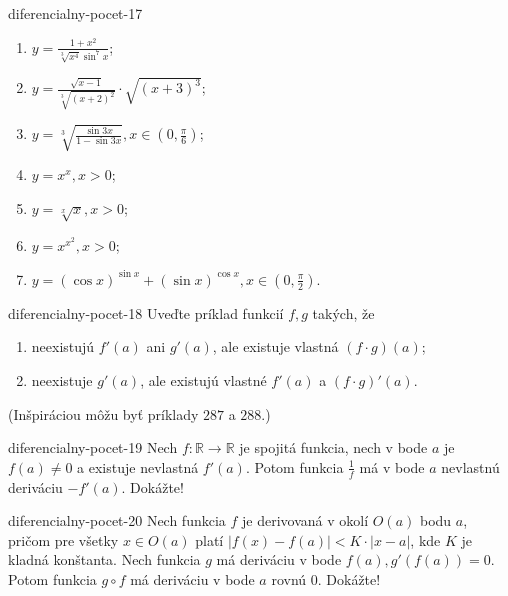 \begin{defproblem}{diferencialny-pocet-17}
\begin{multicols}{2}
\begin{enumerate}
    \item $y=\frac{1+x^2}{\sqrt[3]{x^4}\sin^7 x}$;
    \item $y=\frac{\sqrt{x-1}}{\sqrt[3]{(x+2)^2}}\cdot\sqrt{(x+3)^3}$;
    \item $y=\sqrt[3]{\frac{\sin 3x}{1-\sin 3x}},x\in(0,\frac{\pi}{6})$;
    \item $y=x^x,x>0$;
    \item $y=\sqrt[x]{x},x>0$;
    \item $y=x^{x^2},x>0$;
    \item $y=(\cos x)^{\sin x}+(\sin x)^{\cos x},x\in(0,\frac{\pi}{2})$.
\end{enumerate}
\end{multicols}
\end{defproblem}

\begin{defproblem}{diferencialny-pocet-18}
Uveďte príklad funkcií $f,g$ takých, že 
\begin{enumerate}
\item neexistujú $f'(a)$ ani $g'(a)$, ale existuje vlastná $(f\cdot g)(a)$;
\item neexistuje $g'(a)$, ale existujú vlastné $f'(a)$ a $(f\cdot g)'(a)$.
\end{enumerate}
(Inšpiráciou môžu byť príklady $287$ a $288$.)
\end{defproblem}

\begin{defproblem}{diferencialny-pocet-19}
Nech $f:\mathbb{R}\rightarrow\mathbb{R}$ je spojitá funkcia, nech v bode $a$ je $f(a)\neq 0$ a existuje nevlastná $f'(a)$. Potom funkcia $\frac{1}{f}$ má v bode $a$ nevlastnú deriváciu $-f'(a)$. Dokážte!
\end{defproblem}

\begin{defproblem}{diferencialny-pocet-20}
Nech funkcia $f$ je derivovaná v okolí $O(a)$ bodu $a$, pričom pre všetky $x\in O(a)$ platí $|f(x)-f(a)|<K\cdot |x-a|$, kde $K$ je kladná konštanta. Nech funkcia $g$ má deriváciu v bode $f(a),g'(f(a))=0$. Potom funkcia $g \circ f$ má deriváciu v bode $a$ rovnú $0$. Dokážte!
\end{defproblem}

